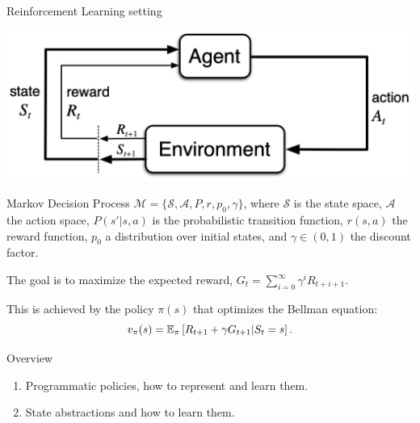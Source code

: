 \begin{frame}{Reinforcement Learning setting}
    \begin{center}
    \includegraphics[width=.6\textwidth]{images/rl.png}
    \end{center}
    
    Markov Decision Process $\mathcal{M} = \{\mathcal{S}, \mathcal{A}, P, r, p_0, \gamma\}$, where $\mathcal{S}$ is the state space, $\mathcal{A}$ the action space, $P(s'|s,a)$ is the probabilistic transition function, $r(s,a)$ the reward function, $p_0$ a distribution over initial states, and $\gamma \in (0,1)$ the discount factor.
    
    The goal is to maximize the expected reward, $G_t = \sum_{i=0}^\infty \gamma^i R_{t+i+1}$. 
    
    This is achieved by the policy $\pi(s)$ that optimizes the Bellman equation:
    \begin{equation*}
        v_\pi(s) = \operatorname{\mathbb{E}}_\pi\left[R_{t+1} + \gamma G_{t+1} | S_t=s\right].
    \end{equation*}
\end{frame}

\note[itemize]{
    \item 
}

\begin{frame}{Overview}
    \begin{enumerate}
        \item Programmatic policies, how to represent and learn them.
        \item State abstractions and how to learn them.
    \end{enumerate}
\end{frame}

\note[itemize]{
    \item
}